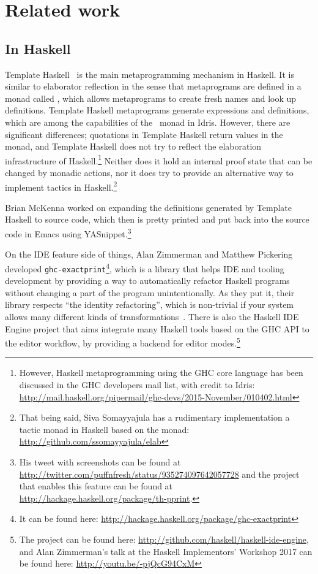 \chapter{Related work} \label{chap:relatedwork}

\section{In Haskell}

Template Haskell~\cite{th} is the main metaprogramming mechanism in Haskell.
It is similar to elaborator reflection in the sense that metaprograms are
defined in a monad called , which allows metaprograms to create fresh
names and look up definitions.
Template Haskell metaprograms generate expressions and definitions, which are
among the capabilities of the \Elab\ monad in Idris.
However, there are significant differences;
quotations in Template Haskell return values in the  monad, and Template
Haskell does not try to reflect the elaboration infrastructure of
Haskell.\footnote{However, Haskell metaprogramming using the GHC core language
has been discussed in the GHC developers mail list, with credit to Idris:
\url{http://mail.haskell.org/pipermail/ghc-devs/2015-November/010402.html}}
Neither does it hold an internal proof state that can be changed by monadic
actions, nor it does try to provide an alternative way to implement tactics in
Haskell.\footnote{That being said, Siva Somayyajula has a rudimentary
implementation a tactic monad in Haskell based on the  monad:
\url{http://github.com/ssomayyajula/elab}}

Brian McKenna worked on expanding the definitions generated by Template Haskell
to source code, which then is pretty printed and put back into the source code
in Emacs using YASnippet.\footnote{His tweet with screenshots can be found at
\url{http://twitter.com/puffnfresh/status/935274097642057728} and the project
that enables this feature can be found at
\url{http://hackage.haskell.org/package/th-pprint}.}

On the IDE feature side of things, Alan Zimmerman and Matthew Pickering
developed \texttt{ghc-exactprint}\footnote{It can be found here:
\url{http://hackage.haskell.org/package/ghc-exactprint}}, which is a library
that helps IDE and tooling development by providing a way to automatically
refactor Haskell programs without changing a part of the program
unintentionally. As they put it, their library respects ``the identity
refactoring'', which is non-trivial if your system allows many different kinds
of transformations~\cite{ghc-exactprint-blog}.
There is also the Haskell IDE Engine project that aims integrate many Haskell
tools based on the GHC API to the editor workflow, by providing a backend for
editor modes.\footnote{The project can be found here:
\url{http://github.com/haskell/haskell-ide-engine}, and Alan Zimmerman's talk
at the Haskell Implementors' Workshop 2017 can be found here:
\url{http://youtu.be/-pjQcG94CxM}}

